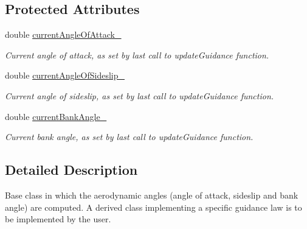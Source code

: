 \subsection*{Protected Attributes}
\begin{DoxyCompactItemize}
\item 
double \hyperlink{classtudat_1_1aerodynamics_1_1AerodynamicGuidance_abf93dc422542fbbbabd8102e105c0e50}{current\+Angle\+Of\+Attack\+\_\+}\hypertarget{classtudat_1_1aerodynamics_1_1AerodynamicGuidance_abf93dc422542fbbbabd8102e105c0e50}{}\label{classtudat_1_1aerodynamics_1_1AerodynamicGuidance_abf93dc422542fbbbabd8102e105c0e50}

\begin{DoxyCompactList}\small\item\em Current angle of attack, as set by last call to update\+Guidance function. \end{DoxyCompactList}\item 
double \hyperlink{classtudat_1_1aerodynamics_1_1AerodynamicGuidance_ad1921668cf3feb2bedbb183713b03843}{current\+Angle\+Of\+Sideslip\+\_\+}\hypertarget{classtudat_1_1aerodynamics_1_1AerodynamicGuidance_ad1921668cf3feb2bedbb183713b03843}{}\label{classtudat_1_1aerodynamics_1_1AerodynamicGuidance_ad1921668cf3feb2bedbb183713b03843}

\begin{DoxyCompactList}\small\item\em Current angle of sideslip, as set by last call to update\+Guidance function. \end{DoxyCompactList}\item 
double \hyperlink{classtudat_1_1aerodynamics_1_1AerodynamicGuidance_a7bd38e6cef133b0ed8487d8d88cdc9ad}{current\+Bank\+Angle\+\_\+}\hypertarget{classtudat_1_1aerodynamics_1_1AerodynamicGuidance_a7bd38e6cef133b0ed8487d8d88cdc9ad}{}\label{classtudat_1_1aerodynamics_1_1AerodynamicGuidance_a7bd38e6cef133b0ed8487d8d88cdc9ad}

\begin{DoxyCompactList}\small\item\em Current bank angle, as set by last call to update\+Guidance function. \end{DoxyCompactList}\end{DoxyCompactItemize}


\subsection{Detailed Description}
Base class in which the aerodynamic angles (angle of attack, sideslip and bank angle) are computed. A derived class implementing a specific guidance law is to be implemented by the user. 

